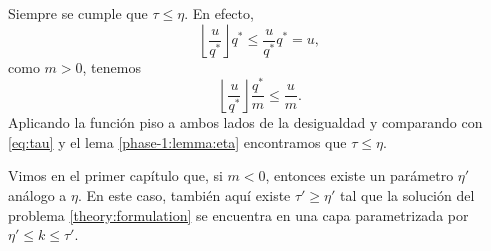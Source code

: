 \begin{observation}
	Siempre se cumple que $\tau \leq \eta$. En efecto,
	\begin{equation*}
		\left\lfloor \frac{u}{q^*} \right\rfloor q^*
		\leq \frac{u}{q^*} q^* = u,
	\end{equation*}
	como $m > 0$, tenemos
	\begin{equation*}
		\left\lfloor \frac{u}{q^*} \right\rfloor \frac{q^*}{m}
		\leq \frac{u}{m}.
	\end{equation*}
	Aplicando la función piso a ambos lados de la desigualdad y comparando con \eqref{eq:tau} y el
	lema \ref{phase-1:lemma:eta} encontramos que $\tau \leq \eta$.
\end{observation}
Vimos en el primer capítulo que, si $m < 0$, entonces existe un parámetro $\eta'$ análogo a $\eta$.
En este caso, también
aquí existe $\tau' \geq \eta'$ tal que la solución del problema \eqref{theory:formulation} se
encuentra en una capa parametrizada por $\eta' \leq k \leq \tau'$.


